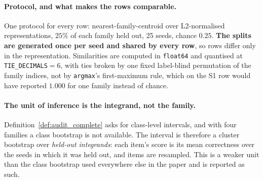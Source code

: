 \paragraph{Protocol, and what makes the rows comparable.} One protocol for every row: nearest-family-centroid over L2-normalised representations, $25\%$ of each family held out, 25 seeds, chance $0.25$. \textbf{The splits are generated once per seed and shared by every row}, so rows differ only in the representation. Similarities are computed in \texttt{float64} and quantised at \texttt{TIE\_DECIMALS}${=}6$, with ties broken by one fixed label-blind permutation of the family indices, not by \texttt{argmax}'s first-maximum rule, which on the S1 row would have reported $1.000$ for one family instead of chance.

\paragraph{The unit of inference is the integrand, not the family.} Definition~\ref{def:audit_complete} asks for class-level intervals, and with four families a class bootstrap is not available. The interval is therefore a cluster bootstrap over \emph{held-out integrands}: each item's score is its mean correctness over the seeds in which it was held out, and items are resampled. This is a weaker unit than the class bootstrap used everywhere else in the paper and is reported as such.

